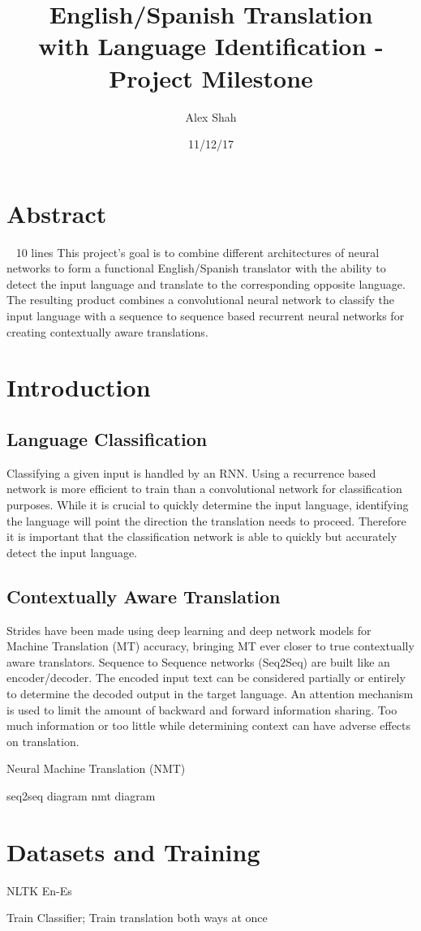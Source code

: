\documentclass[10pt,a4paper]{report}
\begin{document}
\title{English/Spanish Translation \\ with Language Identification - \\ Project Milestone}
\author{Alex Shah}
\date{11/12/17}

\maketitle

\section{Abstract} ~ 10 lines
This project's goal is to combine different architectures of neural networks to form a functional English/Spanish translator with the ability to detect the input language and translate to the corresponding opposite language. The resulting product combines a convolutional neural network to classify the input language with a sequence to sequence based recurrent neural networks for creating contextually aware translations.

\section{Introduction}

\subsection{Language Classification}
Classifying a given input is handled by an RNN. Using a recurrence based network is more efficient to train than a convolutional network for classification purposes. While it is crucial to quickly determine the input language, identifying the language will point the direction the translation needs to proceed. Therefore it is important that the classification network is able to quickly but accurately detect the input language.

\subsection{Contextually Aware Translation}
Strides have been made using deep learning and deep network models for Machine Translation (MT) accuracy, bringing MT ever closer to true contextually aware translators. Sequence to Sequence networks (Seq2Seq) are built like an encoder/decoder. The encoded input text can be considered partially or entirely to determine the decoded output in the target language. An attention mechanism is used to limit the amount of backward and forward information sharing. Too much information or too little while determining context can have adverse effects on translation. 

Neural Machine Translation (NMT)

seq2seq diagram
nmt diagram

\section{Datasets and Training}
NLTK En-Es

Train Classifier; Train translation both ways at once
\end{document}
